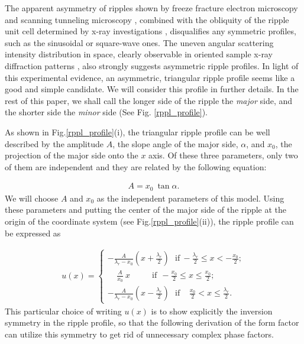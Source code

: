The apparent asymmetry of ripples shown by freeze fracture electron 
microscopy \cite{Luna77,Cop80,Rup83,Zas87} and scanning tunneling microscopy 
\cite{Zas88a,Hata93}, combined with the obliquity of the ripple unit cell 
determined by x-ray investigations 
\cite{Tar73,JanSS79,Ino80,Ale85,Sir88,Wac89a,Kat95}, 
disqualifies any symmetric profiles, such as the sinusoidal or square-wave 
ones. The uneven angular scattering intensity distribution in 
space, clearly observable in oriented sample x-ray diffraction patterns 
\cite{Ale85,JanSS79}, also strongly suggests asymmetric ripple profiles.
In light of this experimental evidence, an asymmetric, 
triangular ripple profile seems like a good and simple candidate.
We will consider this profile in further details. In the rest of this paper,
we shall call the longer side of the ripple the {\it major} side, and the 
shorter side the {\it minor} side (See Fig. \ref{rppl_profile}).

As shown in Fig.\ref{rppl_profile}(i), the triangular ripple profile can 
be well described
by the amplitude $A$, the slope angle of the major side, $\alpha$, and
$x_0$, the projection of the major side onto the $x$ axis. Of these three
parameters, only two of them are independent and they are related by the 
following equation:

\begin{eqnarray}
\label{tripara}
A = x_0\ \tan \alpha.
\end{eqnarray}
We will choose $A$ and $x_0$ as the independent parameters of this model.
Using these parameters and putting the center of the major side of the ripple
at the origin of the coordinate system (see Fig.\ref{rppl_profile}(ii)), the 
ripple profile can be expressed as

\begin{eqnarray}
\label{profile}
u(x) = \left\{ \begin{array}{ll}
		-\frac{A}{\lambda_r - x_0} (x + \frac{\lambda_r}{2})
\ \ \ \mbox{if}\ - \frac{\lambda_r}{2} \le x < - \frac{x_0}{2};\\
		\ \ \ \ \ \frac{A}{x_0}\ x\ \ \ \ \ \ \ \ \ \ \ \ \mbox{if}
\ \ - \frac{x_0}{2} \le x \le 
\frac{x_0}{2};\\
		-\frac{A}{\lambda_r - x_0} (x - \frac{\lambda_r}{2})
\ \ \ \mbox{if}\ \ \ \ \  \frac{x_0}{2} < x \le \frac{\lambda_r}{2}.
		\end{array}
	\right.
\end{eqnarray}
This particular choice of writing $u(x)$ is to show explicitly the inversion
symmetry in the ripple profile, so that the following derivation of the
form factor can utilize this symmetry to get rid of unnecessary complex
phase factors.


